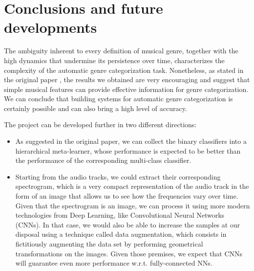 \documentclass{Configuration_Files/PoliMi3i_thesis}
\begin{document}
\chapter{Conclusions and future developments}
\label{ch:conclusions}%
The ambiguity inherent to every definition of musical genre, together with the high dynamics that undermine its persistence over time, characterizes the complexity of the automatic genre categorization task. Nonetheless, as stated in the original paper \cite{original-paper}, the results we obtained are very encouraging and suggest that simple musical features can provide effective information for genre categorization. We can conclude that building systems for automatic genre categorization is certainly possible and can also bring a high level of accuracy. 

The project can be developed further in two different directions:

\begin{itemize}
    \item As suggested in the original paper, we can collect the binary classifiers into a hierarchical meta-learner, whose performance is expected to be better than the performance of the corresponding multi-class classifier.
    \item Starting from the audio tracks, we could extract their corresponding spectrogram, which is a very compact representation of the audio track in the form of an image that allows us to see how the frequencies vary over time. Given that the spectrogram is an image, we can process it using more modern technologies from Deep Learning, like Convolutional Neural Networks (CNNs). In that case, we would also be able to increase the samples at our disposal using a technique called data augmentation, which consists in fictitiously augmenting the data set by performing geometrical transformations on the images. Given those premises, we expect that CNNs will guarantee even more performance w.r.t. fully-connected NNs.
\end{itemize}



\cleardoublepage
\end{document}
